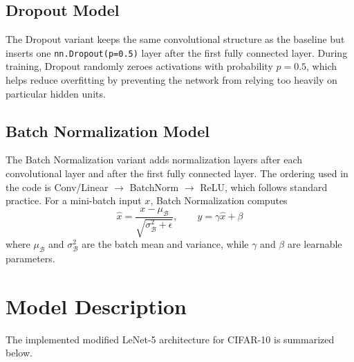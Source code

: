 \documentclass[11pt]{article}
\begin{document}
\subsection{Dropout Model}
The Dropout variant keeps the same convolutional structure as the baseline but inserts
one \texttt{nn.Dropout(p=0.5)} layer after the first fully connected layer. During
training, Dropout randomly zeroes activations with probability $p=0.5$, which helps
reduce overfitting by preventing the network from relying too heavily on particular
hidden units.

\subsection{Batch Normalization Model}
The Batch Normalization variant adds normalization layers after each convolutional
layer and after the first fully connected layer. The ordering used in the code is
Conv/Linear $\rightarrow$ BatchNorm $\rightarrow$ ReLU, which follows standard practice.
For a mini-batch input $x$, Batch Normalization computes
\[
  \hat{x} = \frac{x - \mu_{\mathcal{B}}}{\sqrt{\sigma_{\mathcal{B}}^2 + \epsilon}},
  \qquad
  y = \gamma \hat{x} + \beta
\]
where $\mu_{\mathcal{B}}$ and $\sigma_{\mathcal{B}}^2$ are the batch mean and variance,
while $\gamma$ and $\beta$ are learnable parameters.

\section{Model Description}

The implemented modified LeNet-5 architecture for CIFAR-10 is summarized below.
\end{document}
